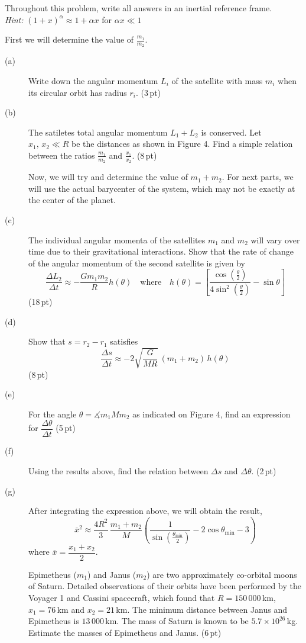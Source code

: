Throughout this problem, write all answers in an inertial reference frame.\\
\emph{Hint:} $(1+x)^\alpha \approx 1 + \alpha x$ for $\alpha x \ll 1$


First we will determine the value of $\frac{m_1}{m_2}$.

\begin{description}
\item[(a)] Write down the angular momentum $L_i$ of the satellite with mass
  $m_i$ when its circular orbit has radius $r_i$. \hfill(3\,pt)
\item[(b)] The satiletes total angular momentum $L_1 + L_2$ is conserved. Let %
  $x_1,\,x_2 \ll R$ be the distances as shown in Figure 4. Find a simple
  relation between the ratios $\frac{m_1}{m_2}$ and $\frac{x_1}{x_2}$.
  \hfill(8\,pt)

  Now, we will try and determine the value of $m_1 + m_2$. For next parts, we
  will use the actual barycenter of the system, which may not be exactly at
  the center of the planet.
\item[(c)] The individual angular momenta of the satellites $m_1$ and $m_2$
  will vary over time due to their gravitational interactions. Show that the
  rate of change of the angular momentum of the second satellite is given by
  \[ \frac{\Delta L_2}{\Delta t} \approx -\frac{G m_1 m_2}{R} h(\theta)
     \quad\text{where}\quad
     h(\theta) = \left[
       \frac{\cos\left(\frac{\theta}{2}\right)}
            {4\sin^2\left(\frac{\theta}{2}\right)} - \sin\theta \right] \]
  \hfill(18\,pt)
\item[(d)] Show that $s = r_2 - r_1$ satisfies
  \[ \frac{\Delta s}{\Delta t} \approx
     -2\sqrt{\frac{G}{MR}}\,(m_1 + m_2)\,h(\theta) \]
  \hfill(8\,pt)
\item[(e)] For the angle $\theta = \measuredangle m_1 M m_2$ as indicated on
  Figure 4, find an expression for
  $\dfrac{\Delta\theta}{\Delta t}$ \hfill(5\,pt)
\item[(f)] Using the results above, find the relation between $\Delta s$ and
  $\Delta\theta$. \hfill(2\,pt)
\item[(g)] After integrating the expression above, we will obtain the result,
  \[ \overline{x}^2 \approx \frac{4R^2}{3}\,\frac{m_1 + m_2}{M}
     \left( \frac{1}{\sin\left(\frac{\theta_{\min}}{2}\right)}
       - 2\cos\theta_{\min} - 3 \right) \]
  where $\overline{x} = \dfrac{x_1 + x_2}{2}$.

  Epimetheus ($m_1$) and Janus ($m_2$) are two approximately co-orbital moons
  of Saturn. Detailed observations of their orbits have been performed by the
  Voyager 1 and Cassini spacecraft, which found that $R = 150\,000$\,km,
  $x_1 = 76$\,km and $x_2 = 21$\,km. The minimum distance between Janus and
  Epimetheus is $13\,000$\,km. The mass of Saturn is known to be
  $5.7 \times 10^{26}$\,kg. Estimate the masses of Epimetheus and Janus.
  \hfill(6\,pt)
\end{description}

